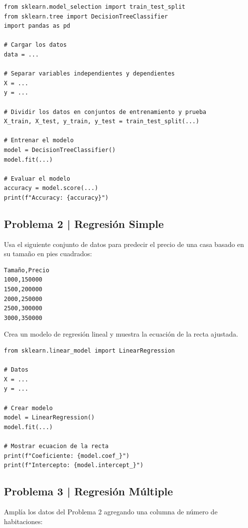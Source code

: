 \documentclass{article}
\begin{document}
\begin{lstlisting}[style=python]
from sklearn.model_selection import train_test_split
from sklearn.tree import DecisionTreeClassifier
import pandas as pd

# Cargar los datos
data = ...

# Separar variables independientes y dependientes
X = ...
y = ...

# Dividir los datos en conjuntos de entrenamiento y prueba
X_train, X_test, y_train, y_test = train_test_split(...)

# Entrenar el modelo
model = DecisionTreeClassifier()
model.fit(...)

# Evaluar el modelo
accuracy = model.score(...)
print(f"Accuracy: {accuracy}")
\end{lstlisting}

\clearpage

\subsection*{Problema 2 | Regresión Simple}

Usa el siguiente conjunto de datos para predecir el precio de una casa basado en su tamaño en pies cuadrados:

\begin{verbatim}
Tamaño,Precio
1000,150000
1500,200000
2000,250000
2500,300000
3000,350000
\end{verbatim}

Crea un modelo de regresión lineal y muestra la ecuación de la recta ajustada.

\begin{lstlisting}[style=python]
from sklearn.linear_model import LinearRegression

# Datos
X = ...
y = ...

# Crear modelo
model = LinearRegression()
model.fit(...)

# Mostrar ecuacion de la recta
print(f"Coeficiente: {model.coef_}")
print(f"Intercepto: {model.intercept_}")
\end{lstlisting}

\clearpage

\subsection*{Problema 3 | Regresión Múltiple}

Amplía los datos del Problema 2 agregando una columna de número de habitaciones:
\end{document}

